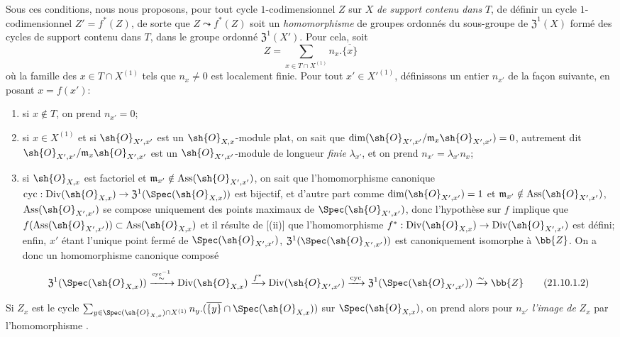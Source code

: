 \begin{env}[21.10.1]
Sous ces conditions, nous nous proposons, pour tout cycle $1$-codimensionnel $Z$ sur $X$ \emph{de support contenu dans} $T$, de définir un cycle $1$-codimensionnel $Z'=f^*(Z)$, de sorte
que $Z\leadsto f^*(Z)$ soit un \emph{homomorphisme} de groupes ordonnés du sous-groupe de $\mathfrak{Z}^1(X)$ formé des cycles de support contenu dans $T$, dans le groupe ordonné $\mathfrak{Z}^1(X')$.
Pour cela, soit
\[
\label{IV.21.10.1.1}
  Z=\sum_{x\in T\cap X^{(1)}}n_x.\overline{\{x\}}
  \tag{21.10.1.1}
\]
où la famille des $x\in T\cap X^{(1)}$ tels que $n_x\neq0$ est localement finie.
Pour tout $x'\in X'^{(1)}$, définissons un entier $n_{x'}$ de la façon suivante, en posant $x=f(x')$:
\begin{enumerate}[label=\arabic*\textsuperscript{o}]
  \item si $x\notin T$, on prend $n_{x'}=0$;
  \item si $x\in X^{(1)}$ et si $\sh{O}_{X',x'}$ est un $\sh{O}_{X,x}$-module plat, on sait  que $\dim(\sh{O}_{X',x'}/\mathfrak{m}_x\sh{O}_{X',x'})=0$, autrement dit $\sh{O}_{X',x'}/\mathfrak{m}_x\sh{O}_{X',x'}$ est un $\sh{O}_{X',x'}$-module de longueur \emph{finie} $\lambda_{x'}$, et on prend $n_{x'}=\lambda_{x'}n_x$;
  \item si $\sh{O}_{X,x}$ est factoriel et $\mathfrak{m}_{x'}\notin\operatorname{Ass}(\sh{O}_{X',x'})$, on sait  que l'homomorphisme canonique $\operatorname{cyc}:\operatorname{Div}(\sh{O}_{X,x})\to\mathfrak{Z}^1(\Spec(\sh{O}_{X,x}))$ est bijectif, et d'autre part comme $\dim(\sh{O}_{X',x'})=1$ et $\mathfrak{m}_{x'}\notin\operatorname{Ass}(\sh{O}_{X',x'})$, $\operatorname{Ass}(\sh{O}_{X',x'})$ se compose uniquement des points maximaux de $\Spec(\sh{O}_{X',x'})$, donc l'hypothèse sur $f$ implique que $f(\operatorname{Ass}(\sh{O}_{X',x'}))\subset\operatorname{Ass}(\sh{O}_{X,x})$ et il résulte de [(ii)] que l'homomorphisme $f^*:\operatorname{Div}(\sh{O}_{X,x})\to\operatorname{Div}(\sh{O}_{X',x'})$ est défini;
enfin, $x'$ étant l'unique point fermé de $\Spec(\sh{O}_{X',x'})$, $\mathfrak{Z}^1(\Spec(\sh{O}_{X',x'}))$ est canoniquement isomorphe à $\bb{Z}$.
On a donc un homomorphisme canonique composé
\[
\label{IV.21.10.1.2}
  \mathfrak{Z}^1(\Spec(\sh{O}_{X,x}))
  \xrightarrow{\overset{\operatorname{cyc}^{-1}}{\sim}}\operatorname{Div}(\sh{O}_{X,x})
  \xrightarrow{f^*}\operatorname{Div}(\sh{O}_{X',x'})
  \xrightarrow{\operatorname{cyc}}\mathfrak{Z}^1(\Spec(\sh{O}_{X',x'}))
  \xrightarrow{\sim}\bb{Z}
  \tag{21.10.1.2}
\]
\end{enumerate}

Si $Z_x$ est le cycle $\sum_{y\in\Spec(\sh{O}_{X,x})\cap X^{(1)}}n_y.(\overline{\{y\}}\cap\Spec(\sh{O}_{X,x}))$ sur $\Spec(\sh{O}_{X,x})$, on prend alors pour $n_{x'}$ \emph{l'image de} $Z_x$ par l'homomorphisme .
\end{env}

